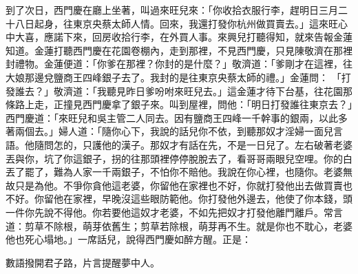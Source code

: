 到了次日，西門慶在廳上坐著，叫過來旺兒來：「你收拾衣服行李，趕明日三月二十八日起身，往東京央蔡太師人情。回來，我還打發你杭州做買賣去。」這來旺心中大喜，應諾下來，回房收拾行李，在外買人事。來興兒打聽得知，就來告報金蓮知道。金蓮打聽西門慶在花園卷棚內，走到那裡，不見西門慶，只見陳敬濟在那裡封禮物。金蓮便道：「你爹在那裡？你封的是什麼？」敬濟道：「爹剛才在這裡，往大娘那邊兌鹽商王四峰銀子去了。我封的是往東京央蔡太師的禮。」金蓮問： 「打發誰去？」敬濟道：「我聽見昨日爹吩咐來旺兒去。」這金蓮才待下台基，往花園那條路上走，正撞見西門慶拿了銀子來。叫到屋裡，問他：「明日打發誰往東京去？」西門慶道：「來旺兒和吳主管二人同去。因有鹽商王四峰一千幹事的銀兩，以此多著兩個去。」婦人道：「隨你心下，我說的話兒你不依，到聽那奴才淫婦一面兒言語。他隨問怎的，只護他的漢子。那奴才有話在先，不是一日兒了。左右破著老婆丟與你，坑了你這銀子，拐的往那頭裡停停脫脫去了，看哥哥兩眼兒空哩。你的白丟了罷了，難為人家一千兩銀子，不怕你不賠他。我說在你心裡，也隨你。老婆無故只是為他。不爭你貪他這老婆，你留他在家裡也不好，你就打發他出去做買賣也不好。你留他在家裡，早晚沒這些眼防範他。你打發他外邊去，他使了你本錢，頭一件你先說不得他。你若要他這奴才老婆，不如先把奴才打發他離門離戶。常言道：剪草不除根，萌芽依舊生；剪草若除根，萌芽再不生。就是你也不耽心，老婆他也死心塌地。」一席話兒，說得西門慶如醉方醒。正是：

數語撥開君子路，片言提醒夢中人。

